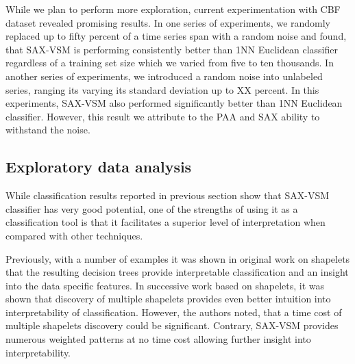 \documentclass{llncs}
\begin{document}
While we plan to perform more exploration, current experimentation with CBF dataset revealed 
promising results. In one series of experiments, we randomly replaced up to fifty percent of a
time series span with a random noise and found, that SAX-VSM is performing consistently better 
than 1NN Euclidean classifier regardless of a training set size which we varied from five to
ten thousands. In another series of experiments, we introduced a random noise into unlabeled
series, ranging its varying its standard deviation up to XX percent. In this experiments, SAX-VSM
also performed significantly better than 1NN Euclidean classifier. However, this result we
attribute to the PAA and SAX ability to withstand the noise.


\subsection{Exploratory data analysis}
While classification results reported in previous section show that SAX-VSM classifier
has very good potential, one of the strengths of using it as a classification tool is that
it facilitates a superior level of interpretation when compared with other techniques. 

Previously, with a number of examples it was shown in original work on shapelets \cite{shapelet}
that the resulting decision trees provide interpretable classification and an insight into the data
specific features. In successive work \cite{bagnal} based on shapelets, it was shown that
discovery of multiple shapelets provides even better intuition into interpretability of
classification. However, the authors noted, that a time cost of multiple shapelets discovery
could be significant. Contrary, SAX-VSM provides numerous weighted patterns at no time cost
allowing further insight into interpretability.
\end{document}
